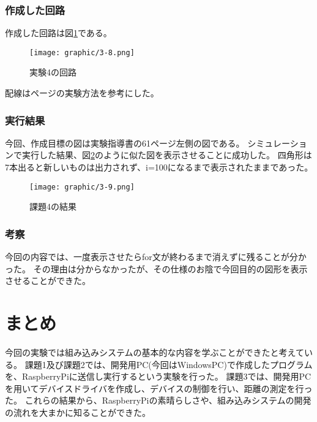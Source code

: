 \documentclass[dvipdfmx]{jsarticle}
\begin{document}
\subsubsection{作成した回路}
作成した回路は図\ref*{fig:3-8}である。
\begin{figure}[H]
  \begin{center}
    \texttt{[image: graphic/3-8.png]}
  \end{center}
  \caption[]{実験4の回路}
  \label{fig:3-8}
\end{figure}

配線はページ\pageref*{sec:2}の実験方法を参考にした。

\subsubsection{実行結果}
今回、作成目標の図は実験指導書の61ページ左側の図である。
シミュレーションで実行した結果、図\ref*{fig:3-9}のように似た図を表示させることに成功した。
四角形は7本出ると新しいものは出力されず、i=100になるまで表示されたままであった。
\begin{figure}[H]
  \begin{center}
    \texttt{[image: graphic/3-9.png]}
  \end{center}
  \caption[]{課題4の結果}
  \label{fig:3-9}
\end{figure}

\subsubsection{考察}
今回の内容では、一度表示させたらfor文が終わるまで消えずに残ることが分かった。
その理由は分からなかったが、その仕様のお陰で今回目的の図形を表示させることができた。

\section{まとめ}
今回の実験では組み込みシステムの基本的な内容を学ぶことができたと考えている。
課題1及び課題2では、開発用PC(今回はWindowsPC)で作成したプログラムを、RaspberryPiに送信し実行するという実験を行った。
課題3では、開発用PCを用いてデバイスドライバを作成し、デバイスの制御を行い、距離の測定を行った。
これらの結果から、RaspberryPiの素晴らしさや、組み込みシステムの開発の流れを大まかに知ることができた。
\end{document}
